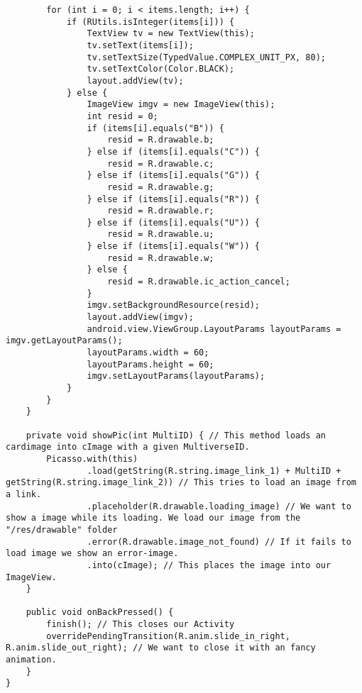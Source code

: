 \begin{lstlisting}
        for (int i = 0; i < items.length; i++) {
            if (RUtils.isInteger(items[i])) {
                TextView tv = new TextView(this);
                tv.setText(items[i]);
                tv.setTextSize(TypedValue.COMPLEX_UNIT_PX, 80);
                tv.setTextColor(Color.BLACK);
                layout.addView(tv);
            } else {
                ImageView imgv = new ImageView(this);
                int resid = 0;
                if (items[i].equals("B")) {
                    resid = R.drawable.b;
                } else if (items[i].equals("C")) {
                    resid = R.drawable.c;
                } else if (items[i].equals("G")) {
                    resid = R.drawable.g;
                } else if (items[i].equals("R")) {
                    resid = R.drawable.r;
                } else if (items[i].equals("U")) {
                    resid = R.drawable.u;
                } else if (items[i].equals("W")) {
                    resid = R.drawable.w;
                } else {
                    resid = R.drawable.ic_action_cancel;
                }
                imgv.setBackgroundResource(resid);
                layout.addView(imgv);
                android.view.ViewGroup.LayoutParams layoutParams = imgv.getLayoutParams();
                layoutParams.width = 60;
                layoutParams.height = 60;
                imgv.setLayoutParams(layoutParams);
            }
        }
    }

    private void showPic(int MultiID) { // This method loads an cardimage into cImage with a given MultiverseID.
        Picasso.with(this)
                .load(getString(R.string.image_link_1) + MultiID + getString(R.string.image_link_2)) // This tries to load an image from a link.
                .placeholder(R.drawable.loading_image) // We want to show a image while its loading. We load our image from the "/res/drawable" folder
                .error(R.drawable.image_not_found) // If it fails to load image we show an error-image.
                .into(cImage); // This places the image into our ImageView.
    }

    public void onBackPressed() {
        finish(); // This closes our Activity
        overridePendingTransition(R.anim.slide_in_right, R.anim.slide_out_right); // We want to close it with an fancy animation.
    }
}
\end{lstlisting}
\newpage
